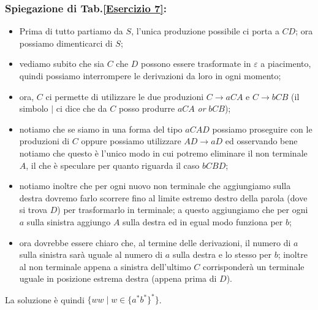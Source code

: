 \documentclass[class=book, crop=false, oneside, 12pt]{standalone}
\begin{document}
\subsubsection*{Spiegazione di Tab.\ref{Esercizio 7}:}
\begin{itemize}
    \item Prima di tutto partiamo da \(S\), l'unica produzione possibile ci porta a \(CD\); ora possiamo dimenticarci di \(S\);
    \item vediamo subito che sia \(C\) che \(D\) possono essere trasformate in \(\varepsilon\) a piacimento, quindi possiamo interrompere le derivazioni da loro in ogni momento;
    \item ora, \(C\) ci permette di utilizzare le due produzioni \(C \to aCA\) e \(C \to bCB\) (il simbolo \(\mid\) ci dice che da \(C\) posso produrre \(aCA\) \emph{or} \(bCB\));
    \item notiamo che se siamo in una forma del tipo \(aCAD\) possiamo proseguire con le produzioni di \(C\) oppure possiamo utilizzare \(AD \to aD\) ed osservando bene notiamo che questo è l'unico modo in cui potremo eliminare il non terminale \(A\), il che è speculare per quanto riguarda il caso \(bCBD\);
    \item notiamo inoltre che per ogni nuovo non terminale che aggiungiamo sulla destra dovremo farlo scorrere fino al limite estremo destro della parola (dove si trova \(D\)) per trasformarlo in terminale; a questo aggiungiamo che per ogni \(a\) sulla sinistra aggiungo \(A\) sulla destra ed in egual modo funziona per \(b\);
    \item ora dovrebbe essere chiaro che, al termine delle derivazioni, il numero di \(a\) sulla sinistra  sarà uguale al numero di \(a\) sulla destra e lo stesso per \(b\); inoltre al non terminale appena a sinistra dell'ultimo \(C\) corrisponderà un terminale uguale in posizione estrema destra (appena prima di \(D\)).
\end{itemize}
La soluzione è quindi \(\{ ww \mid w \in \{a^* b^*\}^*\}\).
\end{document}
